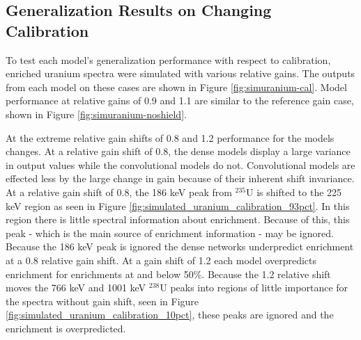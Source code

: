 \subsection{Generalization Results on Changing Calibration} \label{section_uranium_sim_cal}

To test each model's generalization performance with respect to calibration, enriched uranium spectra were simulated with various relative gains. The outputs from each model on these cases are shown in Figure \ref{fig:simuranium-cal}. Model performance at relative gains of 0.9 and 1.1 are similar to the reference gain case, shown in Figure \ref{fig:simuranium-noshield}.

At the extreme relative gain shifts of 0.8 and 1.2 performance for the models changes. At a relative gain shift of 0.8, the dense models display a large variance in output values while the convolutional models do not. Convolutional models are effected less by the large change in gain because of their inherent shift invariance. At a relative gain shift of 0.8, the 186 keV peak from $^{235}$U is shifted to the 225 keV region as seen in Figure \ref{fig:simulated_uranium_calibration_93pct}. In this region there is little spectral information about enrichment. Because of this, this peak - which is the main source of enrichment information - may be ignored. Because the 186 keV peak is ignored the dense networks underpredict enrichment at a 0.8 relative gain shift. At a gain shift of 1.2 each model overpredicts enrichment for enrichments at and below 50\%. Because the 1.2 relative shift moves the 766 keV and 1001 keV $^{238}$U peaks into regions of little importance for the spectra without gain shift, seen in Figure \ref{fig:simulated_uranium_calibration_10pct}, these peaks are ignored and the enrichment is overpredicted.



